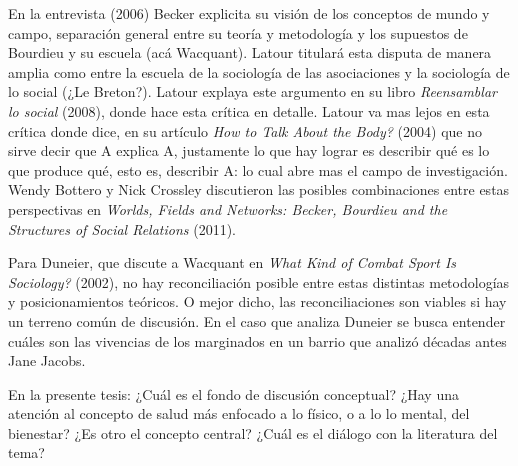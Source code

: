 En la entrevista (2006) Becker explicita su visión de los conceptos de mundo y campo,
separación general entre su teoría y metodología y los supuestos de Bourdieu y su escuela (acá Wacquant).
Latour titulará esta disputa de manera amplia como entre 
la escuela de la sociología de las asociaciones y la sociología de lo social (¿Le Breton?).
Latour explaya este argumento en su libro \textit{Reensamblar lo social} (2008), donde hace esta crítica en detalle.
Latour va mas lejos en esta crítica donde dice, en su artículo \textit{How to Talk About the Body?} (2004)
que no sirve decir que A explica A, justamente lo que hay lograr es describir
qué es lo que produce qué, esto es, describir A: lo cual abre mas el campo de investigación.
Wendy Bottero y Nick Crossley discutieron las posibles combinaciones entre estas perspectivas
en \textit{Worlds, Fields and Networks: Becker, Bourdieu and the Structures of Social Relations} (2011).

Para Duneier, que discute a Wacquant en \textit{What Kind of Combat Sport Is Sociology?} (2002),
no hay reconciliación posible entre estas distintas metodologías y posicionamientos teóricos.
O mejor dicho, las reconciliaciones son viables si hay un terreno común de discusión.
En el caso que analiza Duneier se busca entender cuáles son las vivencias de los marginados en un barrio que 
analizó décadas antes Jane Jacobs.

En la presente tesis: ¿Cuál es el fondo de discusión conceptual?
¿Hay una atención al concepto de salud más enfocado a lo físico, o a lo lo mental, del bienestar?
¿Es otro el concepto central? ¿Cuál es el diálogo con la literatura del tema?




